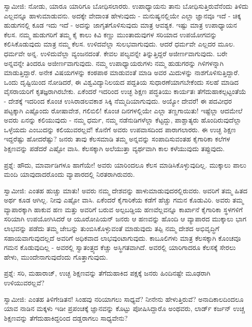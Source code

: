 ಸ್ವಾಮೀಜಿ: ನೋಡು, ಯಾರೂ ಯಾರಿಗೂ ಬೋಧಿಸಲಾರರು. ಉಪಾಧ್ಯಾಯನು ತಾನು ಬೋಧಿಸುತ್ತಿರುವೆನೆಂದು ತಿಳಿದು ಎಲ್ಲವನ್ನೂ ಹಾಳುಮಾಡುವನು. ಅದಕ್ಕೇ ವೇದಾಂತ ಹೇಳುವುದು - ಮನುಷ್ಯನಲ್ಲಿಯೇ ಎಲ್ಲಾ ಜ್ಞಾನವೂ ಇದೆ - ಚಿಕ್ಕ ಹುಡುಗನಲ್ಲಿ ಕೂಡ ಇದು ಇದೆ - ಅದನ್ನು ಜಾಗೃತಗೊಳಿಸುವುದು ಮಾತ್ರ ಆವಶ್ಯಕ. ಇಷ್ಟು ಮಾತ್ರ ಉಪಾಧ್ಯಾಯನ ಕೆಲಸ. ನಮ್ಮ ಹುಡುಗರಿಗೆ ತಮ್ಮ ಕೈ ಕಾಲು ಕಿವಿ ಕಣ್ಣು ಮುಂತಾದುವುಗಳ ಸರಿಯಾದ ಉಪಯೋಗವನ್ನು ಕಲಿಸಿಕೊಡುವುದು ಮಾತ್ರ ನಮ್ಮ ಕೆಲಸ. ಉಳಿದವೆಲ್ಲಾ ಸುಲಭವಾಗುವುದು. ಆದರೆ ಧರ್ಮವೇ ಎಲ್ಲದರ ಮೂಲ. ಧರ್ಮವೇ ಅನ್ನ. ಉಳಿದುವೆಲ್ಲಾ ವ್ಯಂಜನದಂತೆ. ಕೇವಲ ಪಲ್ಯವನ್ನೇ ತಿನ್ನುತ್ತಿದ್ದರೆ ಅಜೀರ್ಣವಾಗುವುದು. ಬರೇ ಅನ್ನವನ್ನೇ ತಿಂದರೂ ಅಜೀರ್ಣವಾಗುವುದು. ನಮ್ಮ ಉಪಾಧ್ಯಾಯರುಗಳು ನಮ್ಮ ಹುಡುಗರನ್ನು ಗಿಳಿಗಳನ್ನಾಗಿ ಮಾಡುತ್ತಿದ್ದಾರೆ. ಅನೇಕ ವಿಷಯಗಳನ್ನು ಕಂಠಪಾಠ ಮಾಡುವಂತೆ ಮಾಡಿ ಅವರ ಮಿದುಳನ್ನು ನಾಶಗೊಳಿಸುತ್ತಿದ್ದಾರೆ. ಒಂದು ದೃಷ್ಟಿಯಿಂದ ನೋಡಿದರೆ, ಈ ವಿಶ್ವವಿದ್ಯಾನಿಲಯದ ಪದ್ದತಿಯ ಸುಧಾರಣೆಯಾಗಬೇಕೆಂದು ಸಲಹೆ ಮಾಡಿದ ವೈಸರಾಯರಿಗೆ ಕೃತಜ್ಞರಾಗಿರಬೇಕು. ಏಕೆಂದರೆ ಇದರಿಂದ ಉಚ್ಛ ಶಿಕ್ಷಣ ಪದ್ಧತಿಯು ಕಾರ್ಯತಃ ತೆಗೆದುಹಾಕಲ್ಪಟ್ಟಂತೆಯೆ - ದೇಶಕ್ಕೆ ಇದರಿಂದ ಕೊಂಚ ಉಸಿರಾಡಲವಕಾಶ ಸಿಕ್ಕಿ ನೆಮ್ಮದಿಯಾಗುವುದು. ಅಯ್ಯೋ ದೇವರೆ! ಈ ಪದವೀಧರ ಪಟ್ಟಕ್ಕಾಗಿ ಎಷ್ಟೊಂದು ರೋಷಾವೇಶ, ಗಲಿಬಿಲಿ! ಕೊಂಚ ದಿನಗಳಲ್ಲಿಯೇ ಎಲ್ಲಾ ತಣ್ಣಗಾಯಿತು! ಇಷ್ಟೆಲ್ಲಾ ಆದಮೇಲೆ ಅವರು ಏನನ್ನು ಕಲಿಯುವುದು - ನಮ್ಮ ಧರ್ಮ, ನಮ್ಮ ನಡೆನುಡಿಗಳೆಲ್ಲಾ ಕೆಟ್ಟದ್ದು, ಪಾಶ್ಚಾತ್ಯರು ಹೊಂದಿರುವುದೆಲ್ಲಾ ಒಳ್ಳೆಯದು ಎಂಬುದನ್ನು ಕಲಿಯುವರಲ್ಲವೆ! ಕೊನೆಗೆ ಅವರು ಉಪವಾಸದಿಂದ ಪಾರಾಗಲಾರರು. ಈ ಉಚ್ಛ ಶಿಕ್ಷಣ ಇದ್ದರೆಷ್ಟು ಹೋದರೆಷ್ಟು? ಜನರು ತಾವು ಕೆಲಸಮಾಡಿ ತಮ್ಮ ಅನ್ನವನ್ನು ಸಂಪಾದಿಸುವಂತಹ ಕೈಗಾರಿಕಾ ಕಲೆಗಳ ಶಿಕ್ಷಣವನ್ನು ಪಡೆದರೆ ಎಷ್ಟೋ ವಾಸಿ. ಕೆಲಸಕ್ಕಾಗಿ ಅಲೆಯುತ್ತಾ ವ್ಯರ್ಥವಾಗಿ ಕಾಲ ಕಳೆಯುವುದು ತಪ್ಪುವುದು.

ಪ್ರಶ್ನೆ: ಹೌದು, ಮಾರ್ವಾಡಿಗಳೂ ಹಾಗೆಯೇ! ಅವರು ಯಾರಿಂದಲೂ ಕೆಲಸ ಮಾಡಿಸಿಕೊಳ್ಳುವುದಿಲ್ಲ. ಮುಕ್ಕಾಲು ಪಾಲು ಮಂದಿ ಯಾವುದಾದರೊಂದು ವ್ಯಾಪಾರದಲ್ಲಿ ನಿರತರಾಗಿರುವರು.

ಸ್ವಾಮೀಜಿ: ಎಂತಹ ಹುಚ್ಚು ಮಾತು! ಅವರು ನಮ್ಮ ದೇಶವನ್ನು ಹಾಳುಮಾಡುವುದರಲ್ಲಿರುವರು. ಅವರಿಗೆ ತಮ್ಮ ಹಿತದ ಅರ್ಥ ಕೂಡ ಆಗಿಲ್ಲ. ನೀವು ಎಷ್ಟೋ ವಾಸಿ. ಏಕೆಂದರೆ ಕೈಗಾರಿಕೆಯ ಕಡೆಗೆ ಹೆಚ್ಚು ಗಮನ ಕೊಡುವಿರಿ. ಅವರು ತಮ್ಮ ವ್ಯಾಪಾರಕ್ಕಾಗಿ ಹಾಕುವ ಹಣ ಮತ್ತು ಅವರಿಗೆ ಬರುವ ಅಲ್ಪಬಡ್ಡಿಯ ಹಣವೆಲ್ಲವನ್ನೂ ಕಾರ್ಖಾನೆ ಕೈಗಾರಿಕಾ ಸ್ಥಳಗಳಿಗೆ ಸರಿಯಾಗಿ ಉಪಯೋಗಿಸಿದರೆ ಆ ಯೂರೋಪಿಯನ್ ಜನರು ಆ ಹಣವನ್ನು ಹೊಂದಿ ಆ ವ್ಯಾಪಾರದ ಮುಕ್ಕಾಲು ಭಾಗ ಲಾಭವನ್ನು ಪಡೆದು ತಮ್ಮ ಜೇಬನ್ನು ತುಂಬಿಸಿಕೊಳ್ಳುವಂತೆ ಮಾಡುವುದು ತಪ್ಪಿ ನಮ್ಮ ದೇಶದ ಅಭಿವೃದ್ಧಿಗೆ ಸಹಾಯವಾಗುವುದಲ್ಲದೆ ಅವರಿಗೆ ಅಧಿಕವಾದ ಲಾಭವುಂಟಾಗುವುದು. ಕಾಬೂಲಿಗಳು ಮಾತ್ರ ಕೆಲಸಕ್ಕಾಗಿ ಕೊಂಚವೂ ಗಮನ ಕೊಡುವುದಿಲ್ಲ - ಅವರಲ್ಲಿ ಸ್ವಾತಂತ್ರ್ಯದ ಕೆಚ್ಚು ಅಸ್ಥಿಗತವಾಗಿದೆ. ಅವರಲ್ಲಿ ಯಾರಿಗಾದರೂ ಕೆಲಸಕ್ಕೆ ಸೇರಲು ಹೇಳು, ಮುಂದೇನಾಗುವುದೆಂದು ಗೊತ್ತಾಗುವುದು.

ಪ್ರಶ್ನೆ: ಸರಿ, ಮಹಾರಾಜ್, ಉಚ್ಛ ಶಿಕ್ಷಣವನ್ನು ತೆಗೆದುಹಾಕಿದ ಪಕ್ಷಕ್ಕೆ ಜನರು ಹಿಂದಿನಷ್ಟೇ ಮೂಢರಾಗಿ ಉಳಿಯುವರಲ್ಲವೆ?

ಸ್ವಾಮೀಜಿ: ಎಂತಹ ತಿಳಿಗೇಡಿತನ! ಸಿಂಹವು ನರಿಯಾಗಲು ಸಾಧ್ಯವೆ? ನೀನೇನು ಹೇಳುತ್ತಿರುವೆ? ಅನಾದಿಕಾಲದಿಂದಲೂ ಯಾವ ನಾಡಿನ ಮಕ್ಕಳು ಇಡೀ ಪ್ರಪಂಚಕ್ಕೆ ಜ್ಞಾನವನ್ನು ಕೊಟ್ಟು ಪೋಷಿಸಿದ್ದಾರೊ ಅಂಥವರು, ಲಾರ್ಡ್ ಕರ್ಜನ್ ಉಚ್ಚ ಶಿಕ್ಷಣವನ್ನು ತೆಗೆದುಹಾಕಿದ್ದರಿಂದ ದಡ್ಡರಾಗಲು ಸಾಧ್ಯವೇನು?

